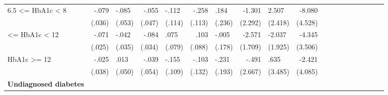 \begin{table}[h]
\begin{center}
{\begin{tabular}{l*{9}{D{.}{.}{-1}l}}
6.5 <= HbA1c < 8&    -.079\sym{**} &    -.085         &    -.055         &    -.112         &    -.258\sym{**} &     .184         &   -1.301         &    2.507         &   -8.080\sym{*}  \\                 &   (.036)         &   (.053)         &   (.047)         &   (.114)         &   (.113)         &   (.236)         &  (2.292)         &  (2.418)         &  (4.528)         \\  <= HbA1c < 12 &    -.071\sym{***}&    -.042         &    -.084\sym{**} &     .075         &     .103         &    -.005         &   -2.571         &   -2.037         &   -4.345         \\                 &   (.025)         &   (.035)         &   (.034)         &   (.079)         &   (.088)         &   (.178)         &  (1.709)         &  (1.925)         &  (3.506)         \\ \addlinespace HbA1c >= 12     &    -.025         &     .013         &    -.039         &    -.155         &    -.103         &    -.231         &    -.491         &     .635         &   -2.421         \\                 &   (.038)         &   (.050)         &   (.054)         &   (.109)         &   (.132)         &   (.193)         &  (2.667)         &  (3.485)         &  (4.085)         \\ \addlinespace 
\textbf{Undiagnosed diabetes} &&&&&&&& \\

\end{tabular}}
\end{center}
\end{table}
